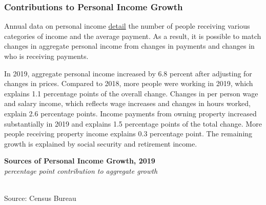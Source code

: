 \documentclass{report}
\newcommand{\barylab}[2]{yticklabel style={text width=#1, align=right, 
		style={black!70}, text height=#2},}
\newcommand{\bbar}[2]{extra #1 ticks = {{#2}}, extra #1 tick labels = ,
		extra #1 tick style = {grid=major, grid style={thick, black!25}},}
\newcommand{\barplotnogrid}{xbar=0pt, axis line style={draw=none},
	    yticklabel style={align=left, anchor=east},
      		xmajorticks=false, ymajorgrids=false,   
	    ytick=data, tickwidth=0pt, area legend, reverse legend,
	    nodes near coords, nodes near coords align={horizontal},}
\begin{document}
{\newpage 
\begin{minipage}{0.76\textwidth} 
\subsubsection*{\color{black!70} \seriffont Contributions to Personal Income Growth}
\small Annual data on personal income \href{https://www.census.gov/data/tables/time-series/demo/income-poverty/cps-pinc/pinc-09.html}{detail} the number of people receiving various categories of income and the average payment. As a result, it is possible to match changes in aggregate personal income from changes in payments and changes in who is receiving payments. 

In 2019, aggregate personal income increased by 6.8 percent after adjusting for changes in prices. Compared to 2018, more people were working in 2019, which explains 1.1 percentage points of the overall change. Changes in per person wage and salary income, which reflects wage increases and changes in hours worked, explain 2.6 percentage points. Income payments from owning property increased substantially in 2019 and explains 1.5 percentage points of the total change. More people receiving property income explains 0.3 percentage point. The remaining growth is explained by social security and retirement income.
\vspace{2mm}

\begin{minipage}{0.55\textwidth}
\normalsize \textbf{Sources of Personal Income Growth, 2019}\\
\footnotesize{\textit{percentage point contribution to aggregate growth}}\\
\hspace*{-4mm} \\
\footnotesize{Source: Census Bureau}
\end{minipage} 
\vspace{5mm}


\end{minipage}}
\end{document}
